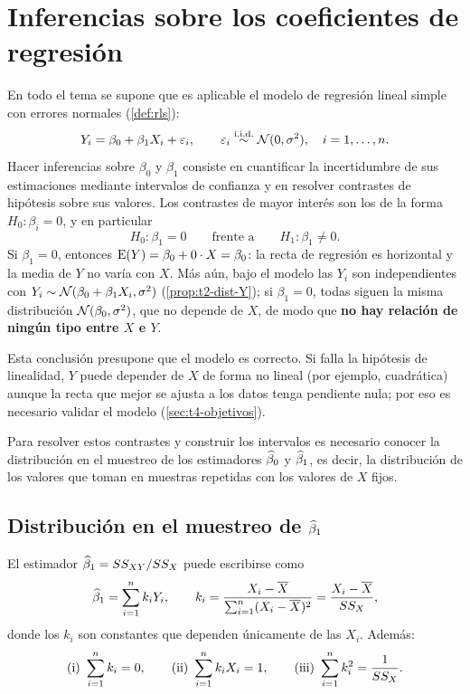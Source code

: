 \section{Inferencias sobre los coeficientes de regresión}
\label{sec:t3-coeficientes}

En todo el tema se supone que es aplicable el modelo de regresión lineal simple con errores
normales (\cref{def:rls}):
\[
  Y_i = \beta_0 + \beta_1X_i + \varepsilon_i, \qquad
  \varepsilon_i \overset{\text{i.i.d.}}{\sim} \mathcal{N}(0,\sigma^2), \quad i=1,\ldots,n .
\]
Hacer inferencias sobre $\beta_0$ y $\beta_1$ consiste en cuantificar la incertidumbre de sus
estimaciones mediante intervalos de confianza y en resolver contrastes de hipótesis sobre sus
valores. Los contrastes de mayor interés son los de la forma $H_0\colon\beta_i=0$, y en
particular
\[
  H_0\colon \beta_1 = 0 \qquad\text{frente a}\qquad H_1\colon \beta_1\neq 0 .
\]
Si $\beta_1=0$, entonces $\operatorname{E}(Y)=\beta_0+0\cdot X=\beta_0$: la recta de regresión es
horizontal y la media de $Y$ no varía con $X$. Más aún, bajo el modelo las $Y_i$ son
independientes con $Y_i\sim\mathcal{N}(\beta_0+\beta_1X_i,\sigma^2)$ (\cref{prop:t2-dist-Y}); si
$\beta_1=0$, todas siguen la misma distribución $\mathcal{N}(\beta_0,\sigma^2)$, que no depende de
$X$, de modo que \textbf{no hay relación de ningún tipo entre $X$ e $Y$}.

Esta conclusión presupone que el modelo es correcto. Si falla la hipótesis de linealidad, $Y$
puede depender de $X$ de forma no lineal (por ejemplo, cuadrática) aunque la recta que mejor se
ajusta a los datos tenga pendiente nula; por eso es necesario validar el modelo
(\cref{sec:t4-objetivos}).

Para resolver estos contrastes y construir los intervalos es necesario conocer la distribución
en el muestreo de los estimadores $\widehat{\beta}_0$ y $\widehat{\beta}_1$, es decir, la distribución de
los valores que toman en muestras repetidas con los valores de $X$ fijos.

\subsection{Distribución en el muestreo de \texorpdfstring{$\widehat{\beta}_1$}{beta1}}

\begin{proposicion}
  El estimador $\widehat{\beta}_1 = SS_{XY}/SS_X$ puede escribirse como
  \[
    \widehat{\beta}_1 = \sum_{i=1}^{n} k_iY_i,
    \qquad
    k_i = \frac{X_i-\overline{X}}{\sum_{i=1}^{n} (X_i-\overline{X})^2} = \frac{X_i-\overline{X}}{SS_X},
  \]
  donde los $k_i$ son constantes que dependen únicamente de las $X_i$. Además:
  \[
    \text{(i) } \sum_{i=1}^{n} k_i = 0, \qquad
    \text{(ii) } \sum_{i=1}^{n} k_iX_i = 1, \qquad
    \text{(iii) } \sum_{i=1}^{n} k_i^2 = \frac{1}{SS_X}.
  \]
\end{proposicion}

